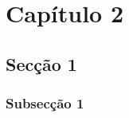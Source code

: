 \chapter{Cap\'itulo 2}
\label{ch:cap2}

\section{Sec\c{c}\~ao 1}
\subsection{Subsec\c{c}\~ao 1}

\lipsum[5] \cite{bolzan/00}

\lipsum[6] \cite{xin/01}

\lipsum[7] \cite{bohr/98}

\lipsum[8] \cite{culf/96}

\lipsum[9] \cite{NBR6023:2002b}

\lipsum[10] \cite{mauri:2003}

\lipsum[11] \cite{lba/06}
